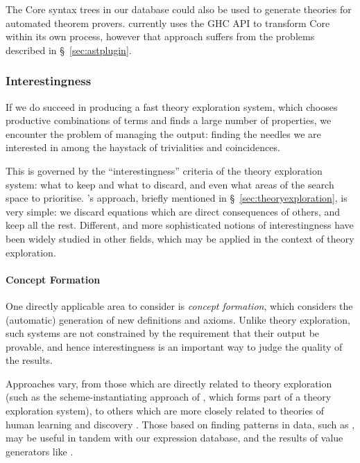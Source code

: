 The Core syntax trees in our database could also be used to generate theories
for automated theorem provers. \hipspec{} currently uses the GHC API to transform
Core within its own process, however that approach suffers from the problems
described in \S~\ref{sec:astplugin}.

\subsubsection{Interestingness}

If we do succeed in producing a fast theory exploration system, which chooses
productive combinations of terms and finds a large number of properties, we
encounter the problem of managing the output: finding the needles we are
interested in among the haystack of trivialities and coincidences.

This is governed by the ``interestingness'' criteria of the theory exploration
system: what to keep and what to discard, and even what areas of the search
space to prioritise. \quickspec{}'s approach, briefly mentioned in
\S~\ref{sec:theoryexploration}, is very simple: we discard equations which are
direct consequences of others, and keep all the rest. Different, and more
sophisticated notions of interestingness have been widely studied in other
fields, which may be applied in the context of theory exploration.

\paragraph{Concept Formation} \label{sec:conceptformation} \leavevmode \newline

One directly applicable area to consider is \emph{concept formation}, which
considers the (automatic) generation of new definitions and axioms. Unlike
theory exploration, such systems are not constrained by the requirement that
their output be provable, and hence interestingness is an important way to judge
the quality of the results.

Approaches vary, from those which are directly related to theory exploration
(such as the scheme-instantiating approach of
\cite{Montano-Rivas.McCasland.Dixon.ea:2012}, which forms part of a theory
exploration system), to others which are more closely related to theories of
human learning and discovery \cite{Piantadosi.Tenenbaum.Goodman:2012,
  mullerunderstanding}. Those based on finding patterns in data, such as
\cite{Wille:2005}, may be useful in tandem with our expression database, and
the results of value generators like \quickcheck{}.

